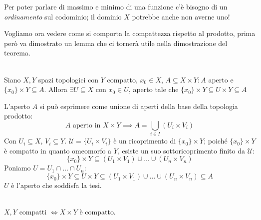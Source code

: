 \begin{attention}
	Per poter parlare di massimo e minimo di una funzione c'è bisogno di un \textit{ordinamento} sul codominio; il dominio $X$ potrebbe anche non averne uno!
\end{attention}
Vogliamo ora vedere come si comporta la compattezza rispetto al prodotto, prima però va dimostrato un lemma che ci tornerà utile nella dimostrazione del teorema.
\begin{lemming}~{\label{tube lemma}}\\
Siano $X,Y$ spazi topologici con $Y$ compatto, $x_0\in X$, $A\subseteq X\times Y\colon A$ aperto e $\{x_0\}\times Y\subseteq A$. Allora $\exists U\subseteq X$ con $x_0\in U$, aperto tale che $\{x_0\}\times Y \subseteq U\times Y \subseteq A$
\end{lemming}
\begin{demonstration}
	L'aperto $A$ si può esprimere come unione di aperti della base della topologia prodotto:
	\begin{equation*}
		A\text{ aperto in }X\times Y\implies A=\bigcup_{i\in I}\left( U_i\times V_i \right)
	\end{equation*}
	Con $U_i\subseteq X$, $V_i\subseteq Y$. $\mathcal{U}=\{U_i\times V_i\}$ è un ricoprimento di $\{x_0\}\times Y$; poiché $\{x_0\}\times Y$ è compatto in quanto omeomorfo a $Y$, esiste un suo sottoricoprimento finito da $\mathcal{U}$:
	\begin{equation*}
		\{x_0\}\times Y\subseteq (U_1\times V_1)\cup\ldots\cup (U_n\times V_n)
	\end{equation*}
	Poniamo $U=U_1\cap\ldots\cap U_n$:
	\begin{equation*}
		\{x_0\}\times Y\subseteq U\times Y \subseteq (U_1\times V_1)	\cup\ldots\cup (U_n\times V_n) \subseteq A
	\end{equation*}
	$U$ è l'aperto che soddisfa la tesi.
\end{demonstration}
\begin{theorema}~{}\label{prodotto compatti}\\
$X,Y$ compatti $\iff X\times Y$ è compatto.
\end{theorema}
